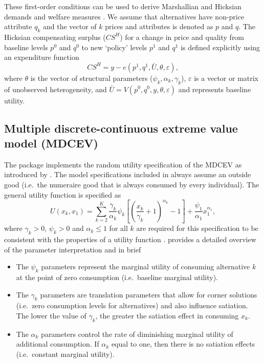 These first-order conditions can be used to derive Marshallian and
Hicksian demands and welfare measures \citep{vonhaefenkuhn-tucker2005}.
We assume that alternatives have non-price attribute \(q_{k}\) and the
vector of \(k\) prices and attributes is denoted as \(p\) and \(q\). The
Hicksian compensating surplus (\(CS^H\)) for a change in price and
quality from baseline levels \(p^0\) and \(q^0\) to new `policy' levels
\(p^1\) and \(q^1\) is defined explicitly using an expenditure function
\begin{equation}
\label{eq:welfare}
CS^H = y - e(p^1, q^1, \bar{U}, \theta, \varepsilon),
\end{equation} \noindent where \(\theta\) is the vector of structural
parameters (\(\psi_k, \alpha_k, \gamma_k\)), \(\varepsilon\) is a vector
or matrix of unobserved heterogeneity, and
\(\bar{U} = V(p^0, q^0, y, \theta, \varepsilon)\) and represents
baseline utility.

\hypertarget{multiple-discrete-continuous-extreme-value-model-mdcev}{%
\subsection{Multiple discrete-continuous extreme value model
(MDCEV)}\label{multiple-discrete-continuous-extreme-value-model-mdcev}}

The  package implements the random utility specification of
the MDCEV as introduced by \citet{bhatmultiple2008}. The model
specifications included in  always assume an outside good
(i.e.~the numeraire good that is always consumed by every individual).
The general utility function is specified as \begin{equation}
U(x_k, x_1) = \sum_{k=2}^{K} \frac{\gamma_k}{\alpha_k}\psi_k \left[ \left( \frac{x_k}{\gamma_k} + 1 \right)^{\alpha_k} - 1 \right] + \frac{\psi_1}{\alpha_1}x_1^{\alpha_1} \label{utilkt},
\end{equation} \noindent where \(\gamma_k > 0\), \(\psi_k > 0\) and
\(\alpha_k \leq 1\) for all \(k\) are required for this specification to
be consistent with the properties of a utility function
\citep{bhatmultiple2008}. \citet{bhatmultiple2008} provides a detailed
overview of the parameter interpretation and in brief

\begin{itemize}
\tightlist
\item
  The \(\psi_k\) parameters represent the marginal utility of consuming
  alternative \(k\) at the point of zero consumption (i.e.~baseline
  marginal utility).
\item
  The \(\gamma_k\) parameters are translation parameters that allow for
  corner solutions (i.e.~zero consumption levels for alternatives) and
  also influence satiation. The lower the value of \(\gamma_k\), the
  greater the satiation effect in consuming \(x_k\).
\item
  The \(\alpha_k\) parameters control the rate of diminishing marginal
  utility of additional consumption. If \(\alpha_k\) equal to one, then
  there is no satiation effects (i.e.~constant marginal utility).
\end{itemize}

